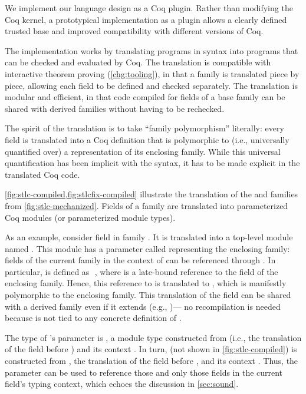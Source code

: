 We implement our language design as a Coq plugin.
Rather than modifying the Coq kernel, a prototypical implementation as a
plugin allows a clearly defined trusted base and
improved compatibility with different versions of Coq.

The implementation works by translating programs in \Lang syntax into
programs that can be checked and evaluated by Coq.
The translation is compatible with interactive theorem proving (\ref{chg:tooling}), in that
a family is translated piece by piece, allowing each field to be defined
and checked separately.
The translation is modular and efficient, in that
code compiled for fields of a base family
can be shared with derived families without having to be rechecked.


The spirit of the translation is to take ``family polymorphism''
literally: every field is translated into a Coq definition that is
polymorphic to (i.e., universally quantified over) a representation of
its enclosing family.
While this universal quantification has been implicit with the \Lang
syntax, it has to be made explicit in the translated Coq code.

\cref{fig:stlc-compiled,fig:stlcfix-compiled} illustrate the translation of the
 and  families from \cref{fig:stlc-mechanized}.
Fields of a family are translated into parameterized Coq modules
(or parameterized module types).

As an example,
consider field  in family .
It is translated into a top-level module named .
This module has a parameter called  representing the enclosing
family: fields of the current family in the context of  can be
referenced through .
In particular,  is defined as \,\lsti{->}\,,
where  is a late-bound reference to the  field of the
enclosing family.
Hence, this reference to  is translated to ,
which is manifestly polymorphic to the enclosing family.
This translation of the  field can be shared
with a derived family even if it extends  (e.g., )---%
no recompilation is needed because  is not tied to any
concrete definition of .

The type of 's  parameter is ,
a module type constructed from 
(i.e., the translation of the field before )
and its context .
In turn,  (not shown in \cref{fig:stlc-compiled}) is
constructed from ,
the translation of the field before ,
and its context .
Thus, the  parameter can be used to reference those and only
those fields in the current field's typing context, which echoes the
discussion in \cref{sec:sound}.

